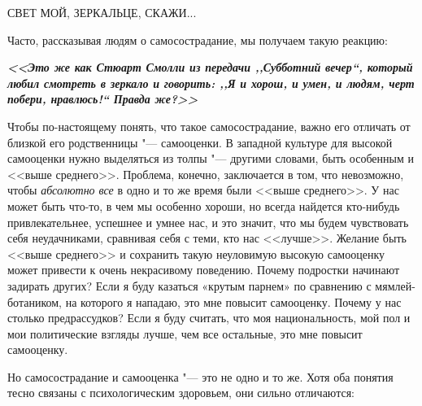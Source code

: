 \vspace{4ex}

\begin{center}
	{\Large СВЕТ МОЙ, ЗЕРКАЛЬЦЕ, СКАЖИ...}	
\end{center}

\vspace{2ex}

Часто, рассказывая людям о самосострадание, мы получаем такую реакцию:

\textbf{\textit{<<Это же как Стюарт Смолли из передачи ,,Субботний вечер``, который любил смотреть в зеркало и говорить: ,,Я и хорош, и умен, и людям, черт побери, нравлюсь!`` Правда же?>> }}

\vspace{2ex}

Чтобы по-настоящему понять, что такое самосострадание, важно его отличать от близкой его родственницы "--- самооценки. В западной культуре для высокой самооценки нужно выделяться из толпы "--- другими словами, быть особенным и <<выше среднего>>. Проблема, конечно, заключается в том, что невозможно, чтобы \emph{абсолютно все} в одно и то же время были <<выше среднего>>. У нас может быть что-то, в чем мы особенно хороши, но всегда найдется кто-нибудь привлекательнее, успешнее и умнее нас, и это значит, что мы будем чувствовать себя неудачниками, сравнивая себя с теми, кто нас <<лучше>>. Желание быть <<выше среднего>> и сохранить такую неуловимую высокую самооценку может привести к очень некрасивому поведению. Почему подростки начинают  задирать других? Если я буду казаться «крутым парнем» по сравнению с мямлей-ботаником, на которого я нападаю, это мне повысит самооценку. Почему у нас столько предрассудков? Если я буду считать, что моя национальность, мой пол и мои политические взгляды лучше, чем все остальные, это мне повысит самооценку.
   
Но самосострадание и самооценка "--- это не одно и то же. Хотя оба понятия тесно связаны с психологическим здоровьем, они сильно отличаются:

